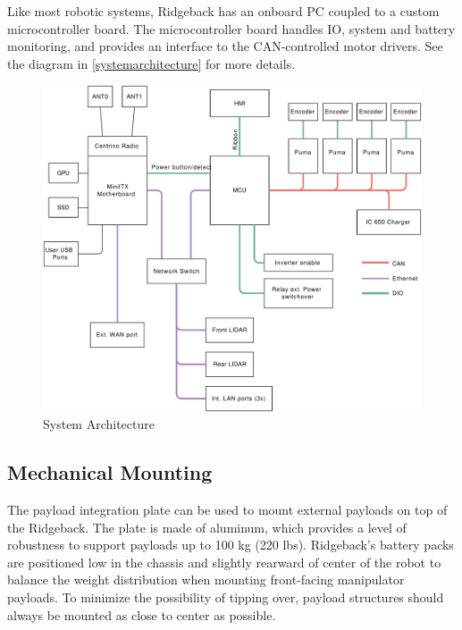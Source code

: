 \documentclass[]{clearpath-latex/clearpath-manual}
\begin{document}
Like most robotic systems, Ridgeback has an onboard PC coupled to a custom microcontroller board. The microcontroller board handles IO, system and battery monitoring, and provides an interface to the CAN-controlled motor drivers. See the diagram in \autoref{systemarchitecture} for more details.

\begin{figure}[!htb]
  \centering
  \includegraphics[width=0.75\linewidth]{ridgeback-logic-conn.pdf}
  \caption{System Architecture}
  \label{systemarchitecture}
\end{figure}

\pagebreak[4]
\subsection{Mechanical Mounting}
\label{mechanical}

The payload integration plate can be used to mount external payloads on top of the Ridgeback.   The plate is made of aluminum, which provides a level of robustness to support payloads up to 100 kg (220 lbs).   Ridgeback's battery packs are positioned low in the chassis and slightly rearward of center of the robot to balance the weight distribution when mounting front-facing manipulator payloads. To minimize the possibility of tipping over, payload structures should always be mounted as close to center as possible.
\end{document}
